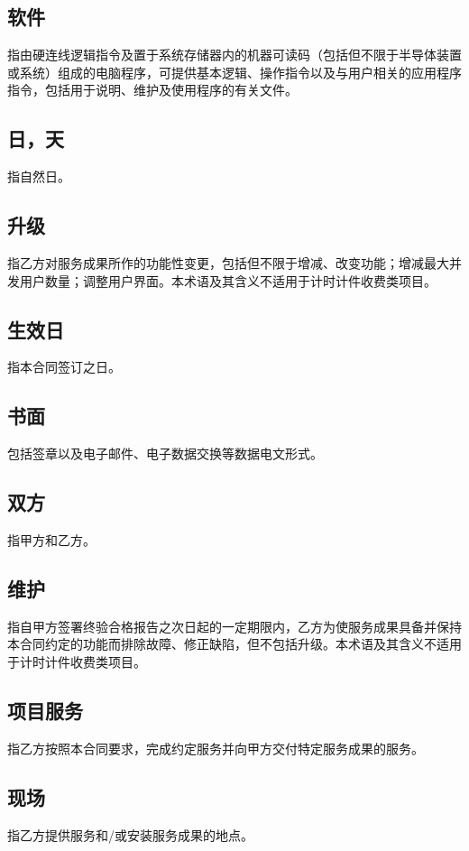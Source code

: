 \subsection{软件}
指由硬连线逻辑指令及置于系统存储器内的机器可读码（包括但不限于半导体装置或系统）组成的电脑程序，可提供基本逻辑、操作指令以及与用户相关的应用程序指令，包括用于说明、维护及使用程序的有关文件。

\subsection{日，天}
指自然日。

\subsection{升级}
指乙方对服务成果所作的功能性变更，包括但不限于增减、改变功能；增减最大并发用户数量；调整用户界面。本术语及其含义不适用于计时计件收费类项目。

\subsection{生效日}
指本合同签订之日。

\subsection{书面}
包括签章以及电子邮件、电子数据交换等数据电文形式。

\subsection{双方}
指甲方和乙方。

\subsection{维护}
指自甲方签署终验合格报告之次日起的一定期限内，乙方为使服务成果具备并保持本合同约定的功能而排除故障、修正缺陷，但不包括升级。本术语及其含义不适用于计时计件收费类项目。

\subsection{项目服务}
指乙方按照本合同要求，完成约定服务并向甲方交付特定服务成果的服务。

\subsection{现场}
指乙方提供服务和/或安装服务成果的地点。

